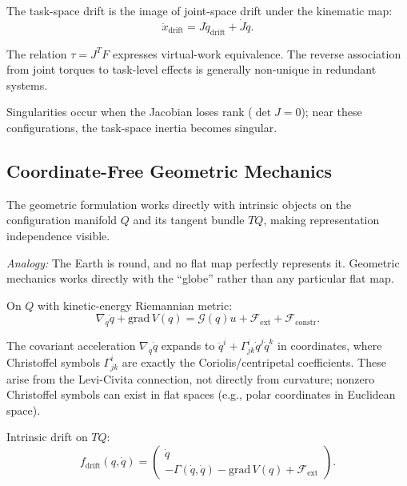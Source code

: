 \documentclass[11pt]{article}
\begin{document}
The task-space drift is the image of joint-space drift under the kinematic map:
\begin{equation}\label{eq:os-drift}
\ddot{x}_{\mathrm{drift}} = J\ddot{q}_{\mathrm{drift}} + \dot{J}\dot{q}.
\end{equation}

The relation $\tau = J^T F$ expresses virtual-work equivalence. The reverse association from joint torques to task-level effects is generally non-unique in redundant systems.

Singularities occur when the Jacobian loses rank ($\det J = 0$); near these configurations, the task-space inertia becomes singular.

\subsection{Coordinate-Free Geometric Mechanics}\label{sec:geometric}

The geometric formulation works directly with intrinsic objects on the configuration manifold $Q$ and its tangent bundle $TQ$, making representation independence visible.

\textit{Analogy:} The Earth is round, and no flat map perfectly represents it. Geometric mechanics works directly with the ``globe'' rather than any particular flat map.

On $Q$ with kinetic-energy Riemannian metric:
\begin{equation}\label{eq:geo-eom}
\nabla_{\dot{q}}\dot{q} + \mathrm{grad}\,V(q) = \mathcal{G}(q)u + \mathcal{F}_{\mathrm{ext}} + \mathcal{F}_{\mathrm{constr}}.
\end{equation}

The covariant acceleration $\nabla_{\dot{q}}\dot{q}$ expands to $\ddot{q}^i + \Gamma^i_{jk}\dot{q}^j\dot{q}^k$ in coordinates, where Christoffel symbols $\Gamma^i_{jk}$ are exactly the Coriolis/centripetal coefficients. These arise from the Levi-Civita connection, not directly from curvature; nonzero Christoffel symbols can exist in flat spaces (e.g., polar coordinates in Euclidean space).

Intrinsic drift on $TQ$:
\begin{equation}\label{eq:geo-drift}
f_{\mathrm{drift}}(q,\dot{q}) = \begin{pmatrix}\dot{q}\\-\Gamma(\dot{q},\dot{q})-\mathrm{grad}\,V(q)+\mathcal{F}_{\mathrm{ext}}\end{pmatrix}.
\end{equation}
\end{document}
